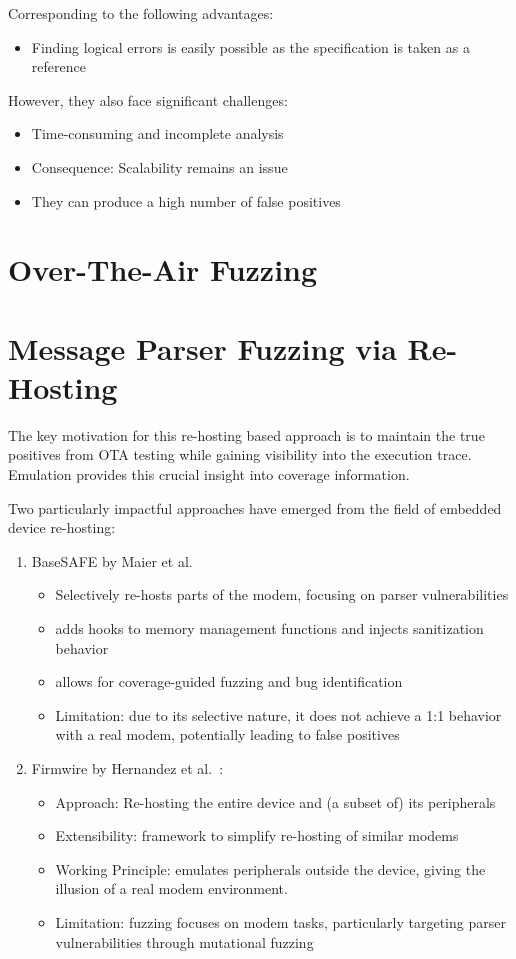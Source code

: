 \documentclass[a4paper,11pt,oneside]{report}
\begin{document}
Corresponding to the following advantages:
\begin{itemize}
  \item Finding logical errors is easily possible as the specification is taken as a reference
\end{itemize}
However, they also face significant challenges:
\begin{itemize}
  \item Time-consuming and incomplete analysis
  \item Consequence: Scalability remains an issue
  \item They can produce a high number of false positives
\end{itemize}

\section{Over-The-Air Fuzzing}

\section{Message Parser Fuzzing via Re-Hosting}


The key motivation for this re-hosting based approach is to maintain the true positives from OTA testing while gaining visibility into the execution trace.
Emulation provides this crucial insight into coverage information.

Two particularly impactful approaches have emerged from the field of embedded device re-hosting:
\begin{enumerate}
  \item BaseSAFE by Maier et al.~\cite{Maier2020}
    \begin{itemize}
      \item Selectively re-hosts parts of the modem, focusing on parser vulnerabilities
      \item adds hooks to memory management functions and injects sanitization behavior
      \item allows for coverage-guided fuzzing and bug identification
      \item Limitation: due to its selective nature, it does not achieve a 1:1 behavior with a real modem, potentially leading to false positives
    \end{itemize}
  \item Firmwire by Hernandez et al.~\cite{Hernandez2022}:
    \begin{itemize}
      \item Approach: Re-hosting the entire device and (a subset of) its peripherals
      \item Extensibility: framework to simplify re-hosting of similar modems
      \item Working Principle: emulates peripherals outside the device, giving the illusion of a real modem environment.
      \item Limitation: fuzzing focuses on modem tasks, particularly targeting parser vulnerabilities through mutational fuzzing
    \end{itemize}
\end{enumerate}
\end{document}
